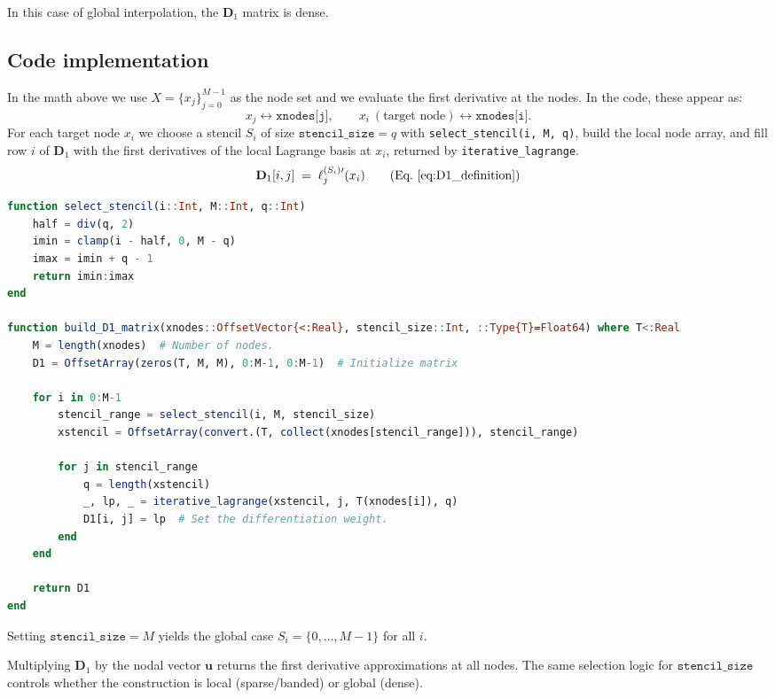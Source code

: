 In this case of global interpolation, the \(\mathbf{D}_1\) matrix is dense.

\clearpage

\subsection*{Code implementation}
In the math above we use \(X=\{x_j\}_{j=0}^{M-1}\) as the node set and we evaluate the
first derivative at the nodes.
In the code, these appear as:
\[
x_j \leftrightarrow \texttt{xnodes[j]}, \qquad
x_i \ (\text{target node}) \leftrightarrow \texttt{xnodes[i]}.
\]
For each target node \(x_i\) we choose a stencil \(S_i\) of size \(\texttt{stencil\_size}=q\) with
\texttt{select\_stencil(i, M, q)}, build the local node array, and fill row \(i\) of
\(\mathbf{D}_1\) with the first derivatives of the local Lagrange basis at \(x_i\),
returned by \texttt{iterative\_lagrange}.
\[
\mathbf{D}_1[i,j] \;=\; \ell^{(S_i)\prime}_j(x_i)\qquad\text{(Eq.~\eqref{eq:D1_definition})}
\]

\begin{lstlisting}[language=Julia]
function select_stencil(i::Int, M::Int, q::Int)
    half = div(q, 2)
    imin = clamp(i - half, 0, M - q)
    imax = imin + q - 1
    return imin:imax
end

function build_D1_matrix(xnodes::OffsetVector{<:Real}, stencil_size::Int, ::Type{T}=Float64) where T<:Real
    M = length(xnodes)  # Number of nodes.
    D1 = OffsetArray(zeros(T, M, M), 0:M-1, 0:M-1)  # Initialize matrix

    for i in 0:M-1
        stencil_range = select_stencil(i, M, stencil_size)
        xstencil = OffsetArray(convert.(T, collect(xnodes[stencil_range])), stencil_range)

        for j in stencil_range
            q = length(xstencil) 
            _, lp, _ = iterative_lagrange(xstencil, j, T(xnodes[i]), q)
            D1[i, j] = lp  # Set the differentiation weight.
        end
    end

    return D1
end
\end{lstlisting}

Setting \(\texttt{stencil\_size}=M\) yields the global case \(S_i=\{0,\dots,M-1\}\) for all \(i\).

Multiplying \(\mathbf{D}_1\) by the nodal vector \(\mathbf{u}\) returns the
first derivative approximations at all nodes. The same selection logic for
\(\texttt{stencil\_size}\) controls whether the construction is local (sparse/banded) or global (dense).

